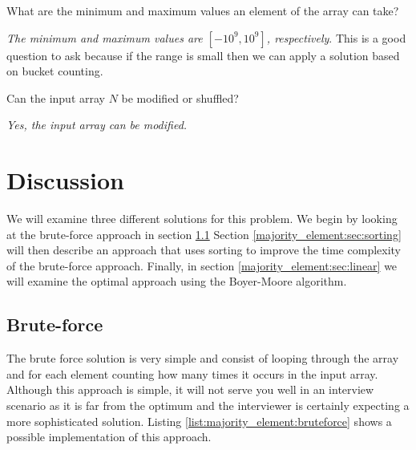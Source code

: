 \begin{QandA}
	\item \begin{questionitem} \begin{question} What are the minimum and maximum values an element of the array can take?   \end{question} 	 
    \begin{answered}
		\textit{The minimum and maximum values are $[-10^9, 10^9]$, respectively}.
		This is a good question to ask because if the range is small then we can apply a solution based on bucket counting.
	\end{answered} \end{questionitem}

	\item \begin{questionitem} \begin{question} Can the input array $N$ be modified or shuffled?   \end{question} 	 
    \begin{answered}
		\textit{Yes, the input array can be modified.}
	\end{answered} \end{questionitem}
\end{QandA}

\section{Discussion}
\label{majority_element:sec:discussion}
We will examine three different solutions for this problem. We begin  by looking at the brute-force approach in section \ref{majority_element:sec:bruteforce} Section \ref{majority_element:sec:sorting} will then describe an approach that uses sorting to improve the time complexity of the brute-force approach. Finally,  in section \ref{majority_element:sec:linear} we will examine the optimal approach using the Boyer-Moore algorithm.

\subsection{Brute-force}
\label{majority_element:sec:bruteforce}
The brute force solution is very simple and consist of looping through the array and for each element counting how many times it occurs in the input array. Although this approach is simple, it will not serve you well in an interview scenario as it is far from the optimum and the interviewer is certainly expecting a more sophisticated solution. 
Listing \ref{list:majority_element:bruteforce} shows a possible implementation of this approach. 


